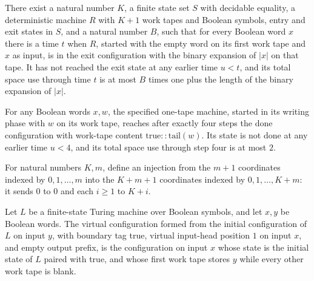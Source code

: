 \begin{theorem}
\label{Complexity.b3a_counter}
\leanok
{}
There exist a natural number $K$, a finite state set $S$ with decidable equality, a
deterministic machine $R$ with $K+1$ work tapes and Boolean symbols, entry and exit
states in $S$, and a natural number $B$, such that for every Boolean word $x$ there is a
time $t$ when $R$, started with the empty word on its first work tape and $x$ as input,
is in the exit configuration with the binary expansion of $|x|$ on that tape. It has not
reached the exit state at any earlier time $u<t$, and its total space use through time
$t$ is at most $B$ times one plus the length of the binary expansion of $|x|$.
\end{theorem}

\begin{theorem}
\label{Complexity.b3a_overwrite}
\leanok
{}
For any Boolean words $x,w$, the specified one-tape machine, started in its writing
phase with $w$ on its work tape, reaches after exactly four steps the done configuration
with work-tape content $\mathrm{true}::\mathrm{tail}(w)$. Its state is not done at any
earlier time $u<4$, and its total space use through step four is at most $2$.
\end{theorem}

\begin{definition}
\label{Complexity.b3a_virtualSelect}
\leanok
For natural numbers $K,m$, define an injection from the $m+1$ coordinates indexed by
$0,1,\ldots,m$ into the $K+m+1$ coordinates indexed by $0,1,\ldots,K+m$: it sends $0$ to
$0$ and each $i\ge1$ to $K+i$.
\end{definition}

\begin{lemma}
\label{Complexity.b3a_virtual_cfg}
\leanok
{}
Let $L$ be a finite-state Turing machine over Boolean symbols, and let $x,y$ be Boolean
words. The virtual configuration formed from the initial configuration of $L$ on input
$y$, with boundary tag true, virtual input-head position $1$ on input $x$, and empty
output prefix, is the configuration on input $x$ whose state is the initial state of $L$
paired with true, and whose first work tape stores $y$ while every other work tape is
blank.
\end{lemma}


